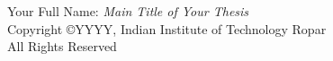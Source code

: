 

\null

\vfill

Your Full Name: \textit{Main Title of Your Thesis}\\
Copyright \copyright YYYY, Indian Institute of Technology Ropar\\
All Rights Reserved
\newpage